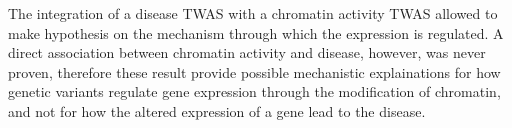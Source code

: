 \documentclass[../main.tex]{subfiles}
\begin{document}
The integration of a disease TWAS with a chromatin activity TWAS allowed 
to make hypothesis on the mechanism through which the expression is 
regulated. A direct association between chromatin activity and disease, 
however, was never proven, therefore these result 
provide possible mechanistic explainations for how genetic variants 
regulate gene expression through the modification of chromatin, and not 
for how the altered expression of a gene lead to the disease.
\end{document}
